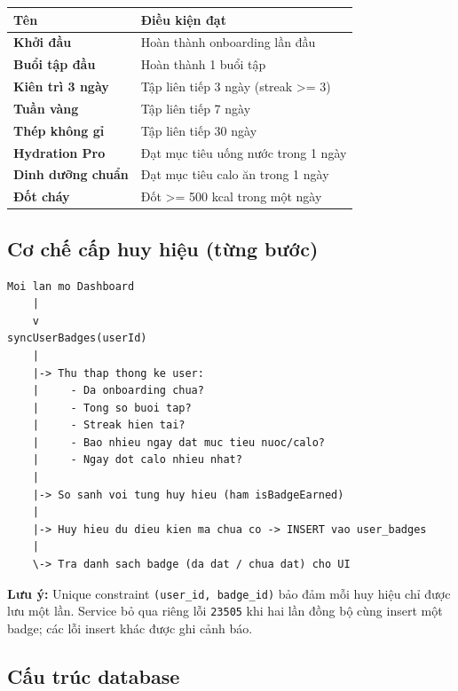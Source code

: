 \documentclass[12pt,a4paper]{article}
\newcounter{none}
\begin{document}
{\def\LTcaptype{none} %
\begin{longtable}[]{@{}ll@{}}
\toprule\noalign{}
Tên & Điều kiện đạt \\
\midrule\noalign{}
\endhead
\bottomrule\noalign{}
\endlastfoot
\textbf{Khởi đầu} & Hoàn thành onboarding lần đầu \\
\textbf{Buổi tập đầu} & Hoàn thành 1 buổi tập \\
\textbf{Kiên trì 3 ngày} & Tập liên tiếp 3 ngày (streak \textgreater=
3) \\
\textbf{Tuần vàng} & Tập liên tiếp 7 ngày \\
\textbf{Thép không gỉ} & Tập liên tiếp 30 ngày \\
\textbf{Hydration Pro} & Đạt mục tiêu uống nước trong 1 ngày \\
\textbf{Dinh dưỡng chuẩn} & Đạt mục tiêu calo ăn trong 1 ngày \\
\textbf{Đốt cháy} & Đốt \textgreater= 500 kcal trong một ngày \\
\end{longtable}
}

\subsection{Cơ chế cấp huy hiệu (từng
bước)}\label{cux1a1-chux1ebf-cux1ea5p-huy-hiux1ec7u-tux1eebng-bux1b0ux1edbc}

\begin{verbatim}
Moi lan mo Dashboard
    |
    v
syncUserBadges(userId)
    |
    |-> Thu thap thong ke user:
    |     - Da onboarding chua?
    |     - Tong so buoi tap?
    |     - Streak hien tai?
    |     - Bao nhieu ngay dat muc tieu nuoc/calo?
    |     - Ngay dot calo nhieu nhat?
    |
    |-> So sanh voi tung huy hieu (ham isBadgeEarned)
    |
    |-> Huy hieu du dieu kien ma chua co -> INSERT vao user_badges
    |
    \-> Tra danh sach badge (da dat / chua dat) cho UI
\end{verbatim}

\textbf{Lưu ý:} Unique constraint \texttt{(user\_id,\ badge\_id)} bảo
đảm mỗi huy hiệu chỉ được lưu một lần. Service bỏ qua riêng lỗi
\texttt{23505} khi hai lần đồng bộ cùng insert một badge; các lỗi insert
khác được ghi cảnh báo.

\subsection{Cấu trúc database}\label{cux1ea5u-truxfac-database}
\end{document}
